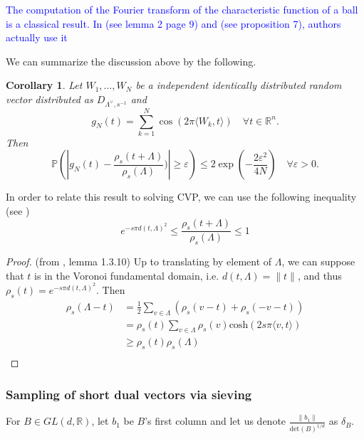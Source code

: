 \documentclass{article}
\newtheorem{corollary}{Corollary}[theorem]
\begin{document}
\textcolor{blue}{The computation of the Fourier transform of the characteristic function of a ball is a classical result. In \cite{ducas2023accurate} (see lemma 2 page 9) and \cite{carrier2024reduction} (see proposition 7), authors actually use it  }   

We can summarize the discussion above by the following.

\begin{corollary}
Let $W_1,\ldots , W_N$ be a independent identically distributed random vector distributed as $D_{\Lambda^\vee , s^{-1}}$ and 
\[g_N(t) = \sum_{k=1}^N\cos(2\pi \langle W_k,t\rangle )\quad\forall t\in\mathbb R^n.\] 
Then 
\[\mathbb P( |g_N(t) - \frac{\rho_s(t+\Lambda)}{\rho_s(\Lambda)}) |\geq \varepsilon ) \leq  2 \exp( - \frac{2\varepsilon^2}{4N}) \quad \forall \varepsilon >0.\]
\end{corollary}

In order to relate this result to solving CVP, we can use the following inequality (see \cite{banaszczyk1993new}) 
\[ e^{-s\pi d(t,\Lambda)^2} \leq \frac{\rho_s(t+\Lambda)}{\rho_s(\Lambda)}\leq 1 \]
\begin{proof}(from \cite{stephens2017gaussian}, lemma 1.3.10)
Up to translating by element of $\Lambda$, we can suppose that $t$ is in the Voronoi fundamental domain, i.e. $d(t,\Lambda) = \|t\|$, and thus $\rho_s(t)= e^{-s\pi d(t,\Lambda)^2}$. Then 
\[\begin{split}
\rho_s(\Lambda - t ) &= \frac{1}{2}\sum_{v\in \Lambda} ( \rho_s(v-t) + \rho_s(-v-t)) \\
	& = \rho_s(t) \sum_{v\in \Lambda}\rho_s(v) \text{cosh}(2s\pi\langle v,t\rangle)\\
	& \geq  \rho_s(t)\rho_s(\Lambda) \\ 
\end{split}\]
\end{proof}

\subsubsection{Sampling of short dual vectors via sieving}

For $B\in GL(d,\mathbb R)$, let $b_1$ be $B$'s first column and let us denote $\frac{\|b_1\|}{\text{det}(B)^{1/d}}$ as $\delta_B$.\\
\end{document}
